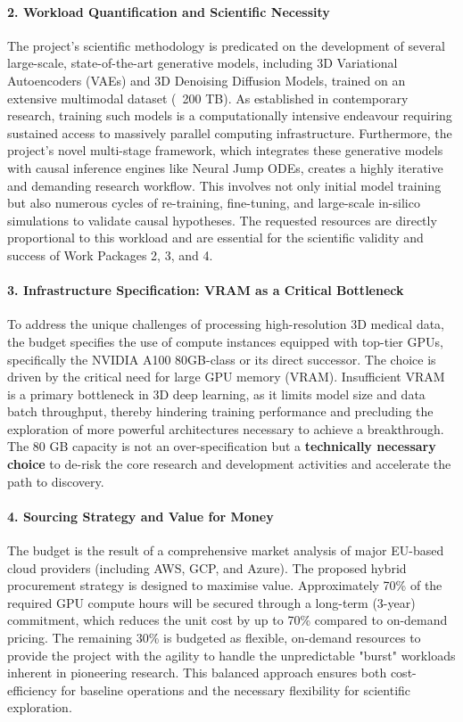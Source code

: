 \paragraph{2. Workload Quantification and Scientific Necessity}
The project's scientific methodology is predicated on the development of several large-scale, state-of-the-art generative models, including 3D Variational Autoencoders (VAEs) and 3D Denoising Diffusion Models, trained on an extensive multimodal dataset (~200 TB). As established in contemporary research, training such models is a computationally intensive endeavour requiring sustained access to massively parallel computing infrastructure. Furthermore, the project's novel multi-stage framework, which integrates these generative models with causal inference engines like Neural Jump ODEs, creates a highly iterative and demanding research workflow. This involves not only initial model training but also numerous cycles of re-training, fine-tuning, and large-scale in-silico simulations to validate causal hypotheses. The requested resources are directly proportional to this workload and are essential for the scientific validity and success of Work Packages 2, 3, and 4.

\paragraph{3. Infrastructure Specification: VRAM as a Critical Bottleneck}
To address the unique challenges of processing high-resolution 3D medical data, the budget specifies the use of compute instances equipped with top-tier GPUs, specifically the NVIDIA A100 80GB-class or its direct successor. The choice is driven by the critical need for large GPU memory (VRAM). Insufficient VRAM is a primary bottleneck in 3D deep learning, as it limits model size and data batch throughput, thereby hindering training performance and precluding the exploration of more powerful architectures necessary to achieve a breakthrough. The 80 GB capacity is not an over-specification but a \textbf{technically necessary choice} to de-risk the core research and development activities and accelerate the path to discovery.

\paragraph{4. Sourcing Strategy and Value for Money}
The budget is the result of a comprehensive market analysis of major EU-based cloud providers (including AWS, GCP, and Azure). The proposed hybrid procurement strategy is designed to maximise value. Approximately 70\% of the required GPU compute hours will be secured through a long-term (3-year) commitment, which reduces the unit cost by up to 70\% compared to on-demand pricing. The remaining 30\% is budgeted as flexible, on-demand resources to provide the project with the agility to handle the unpredictable "burst" workloads inherent in pioneering research. This balanced approach ensures both cost-efficiency for baseline operations and the necessary flexibility for scientific exploration.

